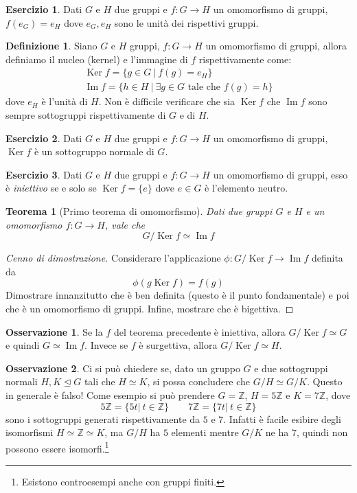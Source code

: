 \documentclass[11pt]{article}
\theoremstyle{plain}
\newtheorem{thm}{Teorema}[section]
\theoremstyle{definition}
\newtheorem{defn}{Definizione}[section]
\newtheorem{exercise}{Esercizio}[section]
\newtheorem*{rem}{Osservazione}
\theoremstyle{remark}
\newcommand{\Z}{\mathbb{Z}}
\DeclareMathOperator{\Ker}{Ker}
\DeclareMathOperator{\Imm}{Im}
\DeclareMathOperator{\iso}{\simeq}
\begin{document}
\begin{exercise}
	Dati $G$ e $H$ due gruppi e $f:G\to H$ un omomorfismo di gruppi, $f(e_G) = e_H$ dove $e_G,e_H$ sono le unità dei rispettivi gruppi.
\end{exercise}

\begin{defn}
	Siano $G$ e $H$ gruppi, $f:G\to H$ un omomorfismo di gruppi, allora definiamo il nucleo (kernel) e l'immagine di $f$ rispettivamente come:
	\begin{gather*}
		\Ker f = \{g\in G\ |\ f(g)=e_H\}\\
		\Imm f =\{ h\in H\ |\ \exists g\in G\text{ tale che }f(g)=h\}
	\end{gather*}
	dove $e_H$ è l'unità di $H$.
	Non è difficile verificare che sia $\Ker f$ che $\Imm f$ sono sempre sottogruppi rispettivamente di $G$ e di $H$.
\end{defn}
\begin{exercise}
	Dati $G$ e $H$ due gruppi e $f:G\to H$ un omomorfismo di gruppi, $\Ker f$ è un sottogruppo normale di $G$.
\end{exercise}
\begin{exercise}
	Dati $G$ e $H$ due gruppi e $f:G\to H$ un omomorfismo di gruppi, esso è \emph{iniettivo} se e solo se $\Ker f = \{e\}$ dove $e\in G$ è l'elemento neutro.
\end{exercise}


\begin{thm}[Primo teorema di omomorfismo]\label{alg:primo_teo_omo}
	Dati due gruppi $G$ e $H$ e un omomorfismo $f:G\to H$, vale che
	\[ G/\Ker f \iso \Imm f\]
\end{thm}
\begin{proof}[Cenno di dimostrazione]
	Considerare l'applicazione $\phi:G/\Ker f \to \Imm f$ definita da 
	\[\phi(g\Ker f) = f(g)\]
	Dimostrare innanzitutto che è ben definita (questo è il punto fondamentale) e poi che è un omomorfismo di gruppi. Infine, mostrare che è bigettiva.
\end{proof}
\begin{rem}
	Se la $f$ del teorema precedente è iniettiva, allora $G/\Ker f\iso G$ e quindi $G\iso \Imm f$. Invece se $f$ è surgettiva, allora $G/\Ker f\iso H$.
\end{rem}

\begin{rem}
	Ci si può chiedere se, dato un gruppo $G$ e due sottogruppi normali $H,K\trianglelefteq G$ tali che $H\iso K$, si possa concludere che $G/H\iso G/K$. Questo in generale è falso! Come esempio si può prendere $G=\Z$, $H=5\Z$ e $K=7\Z$, dove
	\[5\Z=\{ 5t|\ t\in \Z\}\qquad 7\Z=\{ 7t|\ t\in \Z\}\]
	sono i sottogruppi generati rispettivamente da $5$ e $7$.
	Infatti è facile esibire degli isomorfismi $H\iso \Z\iso K$, ma $G/H$ ha $5$ elementi mentre $G/K$ ne ha $7$, quindi non possono essere isomorfi.\footnote{Esistono controesempi anche con gruppi finiti.}
\end{rem}
\end{document}
